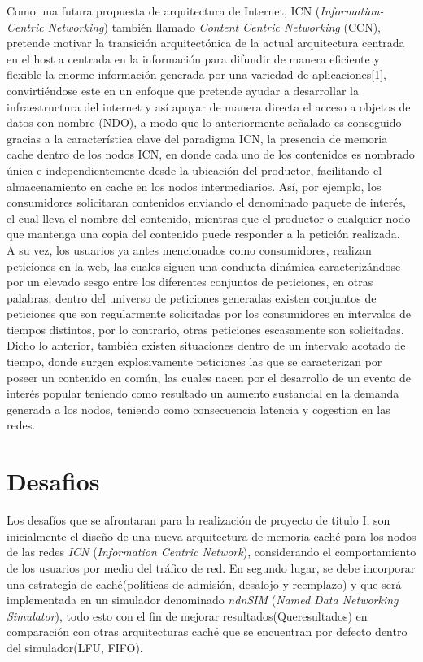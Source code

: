 Como una futura propuesta de arquitectura de Internet, ICN (\textit{Information-Centric Networking}) también llamado \textit{Content Centric Networking} (CCN), pretende motivar la transición arquitectónica de la actual arquitectura centrada en el host a centrada en la información para difundir de manera eficiente y flexible la enorme información generada por una variedad de aplicaciones[1], convirtiéndose este en un enfoque que pretende ayudar a desarrollar la infraestructura del internet y así apoyar de manera directa el acceso a objetos de datos con nombre (NDO), a modo que lo anteriormente señalado es conseguido gracias a la característica clave del paradigma ICN, la presencia de memoria cache dentro de los nodos ICN, en donde cada uno de los contenidos es nombrado única e independientemente desde la ubicación del productor, facilitando el almacenamiento en cache en los nodos intermediarios. Así, por ejemplo, los consumidores solicitaran contenidos enviando el denominado paquete de interés, el cual lleva el nombre del contenido, mientras que el productor o cualquier nodo que mantenga una copia del contenido puede responder a la petición realizada.\\

A su vez, los usuarios ya antes mencionados como consumidores, realizan peticiones en la web, las cuales siguen una conducta dinámica caracterizándose por un elevado sesgo entre los diferentes conjuntos de peticiones, en otras palabras, dentro del universo de peticiones generadas existen conjuntos de peticiones que son regularmente solicitadas por los consumidores en intervalos de tiempos distintos, por lo contrario, otras peticiones escasamente son solicitadas. Dicho lo anterior, también existen situaciones dentro de un intervalo acotado de tiempo, donde surgen explosivamente peticiones las que se caracterizan por poseer un contenido en común, las cuales nacen por el desarrollo de un evento de interés popular teniendo como resultado un aumento sustancial en la demanda generada a los nodos, teniendo como consecuencia latencia y cogestion en las redes.


\section{Desafios}
Los desafíos que se afrontaran para la realización de proyecto de titulo I, son inicialmente el diseño de una nueva arquitectura de memoria caché para los nodos de las redes \textit{ICN} (\textit{Information Centric Network}), considerando el comportamiento de los usuarios por medio del tráfico de red. En segundo lugar, se debe incorporar una estrategia de caché(políticas de admisión, desalojo y reemplazo) y que será implementada en un simulador denominado \textit{ndnSIM} (\textit{Named Data Networking Simulator}), todo esto con el fin de mejorar resultados(Queresultados) en comparación con otras arquitecturas caché que se encuentran por defecto dentro del simulador(LFU, FIFO).\\

